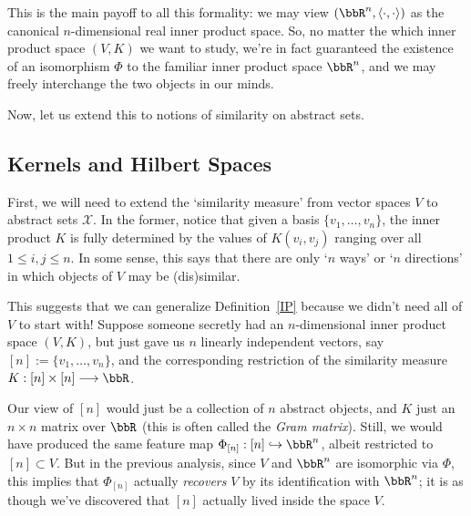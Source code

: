 \documentclass[twoside,11pt]{homework}
\renewcommand{\to}{\longrightarrow}
\begin{document}
This is the main payoff to all this formality: we may view $(\bbR^n, \langle\cdot,\cdot\rangle)$ as the canonical $n$-dimensional real inner product space. So, no matter the which inner product space $(V,K)$ we want to study, we're in fact guaranteed the existence of an isomorphism $\Phi$ to the familiar inner product space $\bbR^n$, and we may freely interchange the two objects in our minds.

Now, let us extend this to notions of similarity on abstract sets.

\subsection{Kernels and Hilbert Spaces}
First, we will need to extend the `similarity measure' from vector spaces $V$ to abstract sets $\mathcal{X}$. In the former, notice that given a basis $\{v_1,\dotsc, v_n\}$, the inner product $K$ is fully determined by the values of $K(v_i,v_j)$ ranging over all $1\leq i,j\leq n$. In some sense, this says that there are only `$n$ ways' or `$n$ directions' in which objects of $V$ may be (dis)similar.

This suggests that we can generalize Definition~\ref{IP} because we didn't need all of $V$ to start with! Suppose someone secretly had an $n$-dimensional inner product space $(V,K)$, but just gave us $n$ linearly independent vectors, say $[n] := \{v_1,\dotsc, v_n\}$, and the corresponding restriction of the similarity measure $K: [n] \times [n] \to \bbR$.

Our view of $[n]$ would just be a collection of $n$ abstract objects, and $K$ just an $n\times n$ matrix over $\bbR$ (this is often called the \emph{Gram matrix}). Still, we would have produced the same feature map $\Phi_{[n]}: [n] \hookrightarrow \bbR^n$, albeit restricted to $[n]\subset V$. But in the previous analysis, since $V$ and $\bbR^n$ are isomorphic via $\Phi$, this implies that $\Phi_{[n]}$ actually \emph{recovers} $V$ by its identification with $\bbR^n$; it is as though we've discovered that $[n]$ actually lived inside the space $V$.
\end{document}
